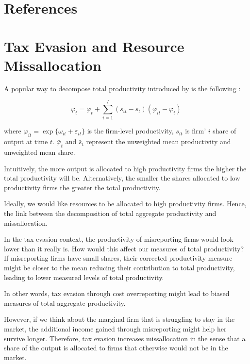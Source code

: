 \documentclass[
  12pt]{article}
\theoremstyle{definition}
\theoremstyle{remark}
\begin{document}
\section{References}\label{references}

\renewcommand{\bibsection}{}


\section{Tax Evasion and Resource
Missallocation}\label{tax-evasion-and-resource-missallocation}

A popular way to decompose total productivity introduced by
\citet{Olley1996} is the following :

\[
\varphi_t = \bar\varphi_t + \sum_{i=1}^I \left(s_{it}-\bar s_{t}\right)\left(\varphi_{it}-\bar\varphi_t\right)
\]

where \(\varphi_{it}=\exp\{\omega_{it}+\varepsilon_{it}\}\) is the
firm-level productivity, \(s_{it}\) is firm' \(i\) share of output at
time \(t\). \(\bar\varphi_t\) and \(\bar s_t\) represent the unweighted
mean productivity and unweighted mean share.

Intuitively, the more output is allocated to high productivity firms the
higher the total productivity will be. Alternatively, the smaller the
shares allocated to low productivity firms the greater the total
productivity.

Ideally, we would like resources to be allocated to high productivity
firms. Hence, the link between the decomposition of total aggregate
productivity and missallocation.

In the tax evasion context, the productivity of misreporting firms would
look lower than it really is. How would this affect our measures of
total productivity? If misreporting firms have small shares, their
corrected productivity measure might be closer to the mean reducing
their contribution to total productivity, leading to lower measured
levels of total productivity.

In other words, tax evasion through cost overreporting might lead to
biased measures of total aggregate productivity.

However, if we think about the marginal firm that is struggling to stay
in the market, the additional income gained through misreporting might
help her survive longer. Therefore, tax evasion increases missallocation
in the sense that a share of the output is allocated to firms that
otherwise would not be in the market.
\end{document}
